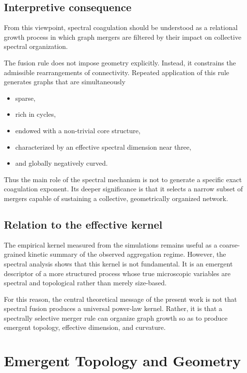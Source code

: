 \documentclass[11pt]{article}
\begin{document}
\subsection{Interpretive consequence}

From this viewpoint, spectral coagulation should be understood as a relational growth process in which graph mergers are filtered by their impact on collective spectral organization.

The fusion rule does not impose geometry explicitly.
Instead, it constrains the admissible rearrangements of connectivity.
Repeated application of this rule generates graphs that are simultaneously

\begin{itemize}
\item sparse,
\item rich in cycles,
\item endowed with a non-trivial core structure,
\item characterized by an effective spectral dimension near three,
\item and globally negatively curved.
\end{itemize}

Thus the main role of the spectral mechanism is not to generate a specific exact coagulation exponent.
Its deeper significance is that it selects a narrow subset of mergers capable of sustaining a collective, geometrically organized network.

\subsection{Relation to the effective kernel}

The empirical kernel measured from the simulations remains useful as a coarse-grained kinetic summary of the observed aggregation regime.
However, the spectral analysis shows that this kernel is not fundamental.
It is an emergent descriptor of a more structured process whose true microscopic variables are spectral and topological rather than merely size-based.

For this reason, the central theoretical message of the present work is not that spectral fusion produces a universal power-law kernel.
Rather, it is that a spectrally selective merger rule can organize graph growth so as to produce emergent topology, effective dimension, and curvature.

\section{Emergent Topology and Geometry}
\label{sec:emergent_geometry}
\end{document}

